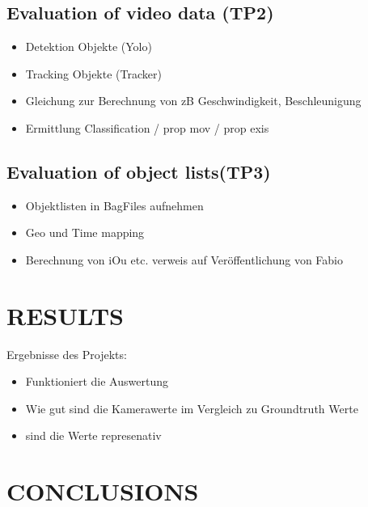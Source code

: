 \documentclass[letterpaper, 10 pt, conference]{ieeeconf}  %
\begin{document}
\subsection{Evaluation of video data (TP2)}

\begin{itemize}
\item Detektion Objekte (Yolo)
\item Tracking Objekte (Tracker)
\item Gleichung zur Berechnung von zB Geschwindigkeit, Beschleunigung
\item Ermittlung Classification / prop mov / prop exis

\end{itemize}





\subsection{Evaluation of object lists(TP3)}

\begin{itemize}
\item Objektlisten in BagFiles aufnehmen
\item Geo und Time mapping
\item Berechnung von iOu etc. verweis auf Veröffentlichung von Fabio




\end{itemize}

\section{RESULTS}

Ergebnisse des Projekts:
 
 \begin{itemize}
\item Funktioniert die Auswertung
\item Wie gut sind die Kamerawerte im Vergleich zu Groundtruth Werte
\item sind die Werte represenativ
\end{itemize}













   
\section{CONCLUSIONS}
\end{document}
